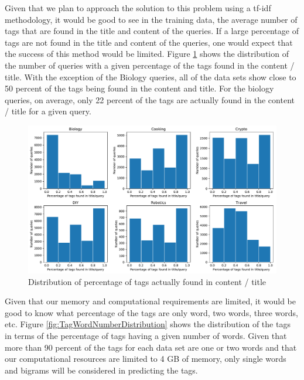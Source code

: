 \documentclass{article}
\begin{document}
Given that we plan to approach the solution to this problem using a tf-idf
methodology, it would be good to see in the training data, the average number
of tags that are found in the title and content of the queries. If a large
percentage of tags are not found in the title and content of the queries, one
would expect that the success of this method would be limited. Figure
\ref{fig:PercentageFoundDistribution} shows the distribution of the number of
queries with a given percentage of the tags found in the content /
title. With the exception of the Biology queries, all of the data sets show
close to 50 percent of the tags being found in the content and title. For the
biology queries, on average, only 22 percent of the tags are actually found in
the content / title for a given query.

\begin{figure}[]
\includegraphics[width=\textwidth]{figures/PercentageFoundDistribution.pdf}
\caption{Distribution of percentage of tags actually found in content / title}
\label{fig:PercentageFoundDistribution}
\end{figure}

Given that our memory and computational requirements are limited, it would be
good to know what percentage of the tags are only word, two words, three
words, etc. Figure \ref{fig:TagWordNumberDistribution} shows the distribution
of the tags in terms of the percentage of tags having a given number of
words. Given that more than 90 percent of the tags for each data set are one
or two words and that our computational resources are limited to 4 GB of
memory, only single words and bigrams will be considered in predicting the
tags. 
\end{document}
